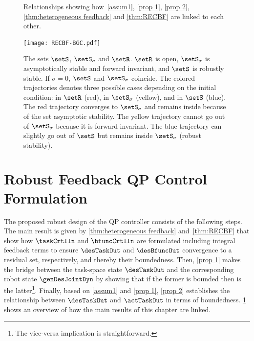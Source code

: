 \begin{figure}
	\caption{Relationships showing how~\cref{assum1}, \cref{prop 1}, \cref{prop 2}, \cref{thm:heterogeneous feedback} and \cref{thm:RECBF} are linked to each other.}  
	\label{fig:theory overview} 
\end{figure}
\begin{figure}
	\centering
	\texttt{[image: RECBF-BGC.pdf]}
	\caption{The sets $\setS$, $\setS_\sigma$ and $\setR$. $\setR$ is open, $\setS_\sigma$ is asymptotically stable and forward invariant, and $\setS$ is robustly stable. If $\sigma=0$, $\setS$ and $\setS_\sigma$ coincide. The colored trajectories denotes three possible cases depending on the initial condition: in $\setR$ (red), in $\setS_\sigma$ (yellow), and in $\setS$ (blue). The red trajectory converges to $\setS_\sigma$ and remains inside because of the set asymptotic stability. The yellow trajectory cannot go out of $\setS_\sigma$ because it is forward invariant. The blue trajectory can slightly go out of $\setS$ but remains inside $\setS_\sigma$ (robust stability).}
	\label{fig:Sets}
\end{figure}

\section{Robust Feedback QP Control Formulation}\label{sec-chap3:Robust QP}
The proposed robust design of the QP controller consists of the following steps. The main result is given by \cref{thm:heterogeneous feedback} and~\ref{thm:RECBF} that show how $\taskCrtlIn$ and $\bfuncCrtlIn$ are formulated including integral feedback terms  to ensure $\desTaskOut $ and  $\desBfuncOut $ convergence to a residual set, respectively, and thereby their boundedness. Then, \cref{prop 1} makes the bridge between the task-space state $\desTaskOut $ and the corresponding robot state $\genDesJointDyn$ by showing that if the former is bounded then is the latter\footnote{The vice-versa implication is straightforward.}. Finally, based on \cref{assum1} and \cref{prop 1}, \cref{prop 2} establishes the relationship between $\desTaskOut$ and $\actTaskOut$ in terms of boundedness. \cref{fig:theory overview} shows an overview of how the main results of this chapter are linked. 

